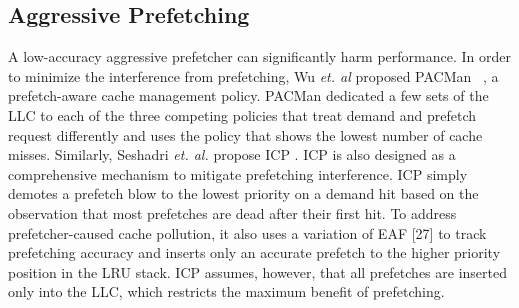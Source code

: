 \subsection{Aggressive Prefetching}

A low-accuracy aggressive prefetcher can significantly harm performance. In order to minimize the interference from prefetching, Wu \textit{et. al} proposed PACMan ~\cite{pacman}, a prefetch-aware cache management policy. PACMan dedicated a few sets of the LLC to each of the three competing policies that treat demand and prefetch request differently and uses the policy that shows the lowest number of cache misses. Similarly, Seshadri  \textit{et. al.} propose ICP \cite{icp}. ICP is also designed as a comprehensive mechanism to mitigate prefetching interference. ICP simply demotes a prefetch blow to the lowest priority on a demand hit based on the observation that most prefetches are dead after their first hit. To address prefetcher-caused cache pollution, it also uses a variation of EAF [27] to track prefetching accuracy and inserts only an accurate prefetch to the higher priority position in the LRU stack. ICP assumes, however, that all prefetches are inserted only into the LLC, which restricts the maximum benefit of prefetching.
